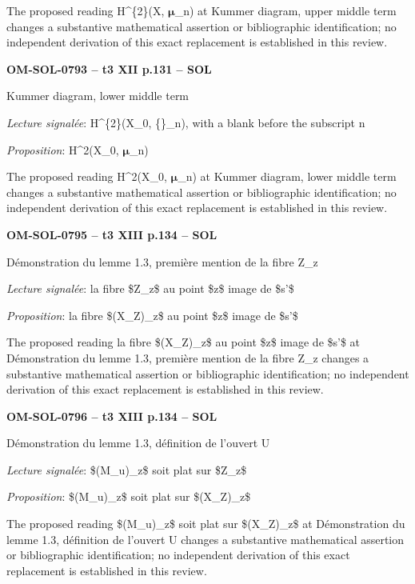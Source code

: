 The proposed reading H\textasciicircum{}\{2\}(X, \ensuremath{𝛍}\_n) at Kummer diagram, upper middle term changes a substantive mathematical assertion or bibliographic identification; no independent derivation of this exact replacement is established in this review.\par
\par\noindent\textbf{OM-SOL-0793 -- t3 XII p.131 -- SOL}\par
Kummer diagram, lower middle term\par
\emph{Lecture signalée}: H\textasciicircum{}\{2\}(X\_0, \{\}\_n), with a blank before the subscript n\par
\emph{Proposition}: H\textasciicircum{}2(X\_0, \ensuremath{𝛍}\_n)\par
The proposed reading H\textasciicircum{}2(X\_0, \ensuremath{𝛍}\_n) at Kummer diagram, lower middle term changes a substantive mathematical assertion or bibliographic identification; no independent derivation of this exact replacement is established in this review.\par
\par\noindent\textbf{OM-SOL-0795 -- t3 XIII p.134 -- SOL}\par
Démonstration du lemme 1.3, première mention de la fibre Z\_z\par
\emph{Lecture signalée}: la fibre \$Z\_z\$ au point \$z\$ image de \$s'\$\par
\emph{Proposition}: la fibre \$(X\_Z)\_z\$ au point \$z\$ image de \$s'\$\par
The proposed reading la fibre \$(X\_Z)\_z\$ au point \$z\$ image de \$s'\$ at Démonstration du lemme 1.3, première mention de la fibre Z\_z changes a substantive mathematical assertion or bibliographic identification; no independent derivation of this exact replacement is established in this review.\par
\par\noindent\textbf{OM-SOL-0796 -- t3 XIII p.134 -- SOL}\par
Démonstration du lemme 1.3, définition de l'ouvert U\par
\emph{Lecture signalée}: \$(M\_u)\_z\$ soit plat sur \$Z\_z\$\par
\emph{Proposition}: \$(M\_u)\_z\$ soit plat sur \$(X\_Z)\_z\$\par
The proposed reading \$(M\_u)\_z\$ soit plat sur \$(X\_Z)\_z\$ at Démonstration du lemme 1.3, définition de l'ouvert U changes a substantive mathematical assertion or bibliographic identification; no independent derivation of this exact replacement is established in this review.\par
